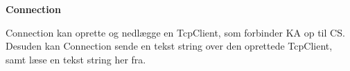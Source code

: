 \textbf{Connection}

Connection kan oprette og nedlægge en TcpClient, som forbinder \gls{KA} op til \gls{CS}. Desuden kan Connection sende en tekst string over den oprettede TcpClient, samt læse en tekst string her fra.

\bigskip